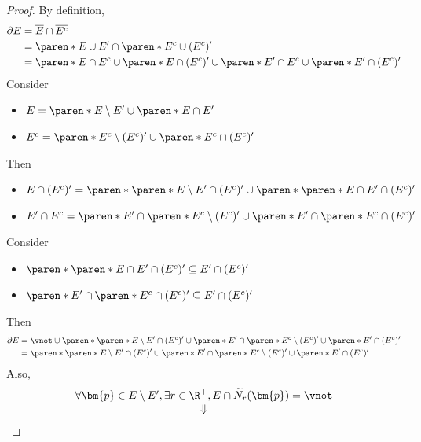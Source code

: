 \begin{proof}
  By definition,
  \begin{align*}
    \partial E & = \overline{E} \cap \overline{E^{c}}                   \\
               & = \paren*{E \cup E'} \cap \paren*{E^{c} \cup (E^{c})'} \\
               & = \paren*{E \cap E^{c}} \cup \paren*{E \cap (E^{c})'}
    \cup \paren*{E' \cap E^{c}} \cup \paren*{E' \cap (E^{c})'}
  \end{align*}
  Consider
  \begin{itemize}
    \item $E = \paren*{E \setminus E'} \cup \paren*{E \cap E'}$
    \item $E^{c} = \paren*{E^{c} \setminus (E^{c})'} \cup \paren*{E^{c} \cap (E^{c})'}$
  \end{itemize}
  Then
  \begin{itemize}
    \item $E \cap (E^{c})' = \paren*{\paren*{E \setminus E'} \cap (E^{c})'}
            \cup \paren*{\paren*{E \cap E'} \cap (E^{c})'}$
    \item $E' \cap E^{c} = \paren*{E' \cap \paren*{E^{c} \setminus (E^{c})'}}
            \cup \paren*{E' \cap \paren*{E^{c} \cap (E^{c})'}}$
  \end{itemize}
  Consider
  \begin{itemize}
    \item $\paren*{\paren*{E \cap E'} \cap (E^{c})'} \subseteq E' \cap (E^{c})'$
    \item $\paren*{E' \cap \paren*{E^{c} \cap (E^{c})'}} \subseteq E' \cap (E^{c})'$
  \end{itemize}
  Then
  \begin{align*}
    \partial E & = \vnot \cup \paren*{\paren*{E \setminus E'} \cap (E^{c})'}
    \cup \paren*{E' \cap \paren*{E^{c} \setminus (E^{c})'}} \cup \paren*{E' \cap (E^{c})'} \\
               & = \paren*{\paren*{E \setminus E'} \cap (E^{c})'}
    \cup \paren*{E' \cap \paren*{E^{c} \setminus (E^{c})'}} \cup \paren*{E' \cap (E^{c})'}
  \end{align*}
  Also,
  \[
    \begin{array}{c}
      \forall \bm{p} \in E \setminus E', \exists r \in \R^{+}, E \cap \widetilde{N}_{r}(\bm{p}) = \vnot \\
      \Downarrow                                                                                        \\

\end{array}\]
\end{proof}

